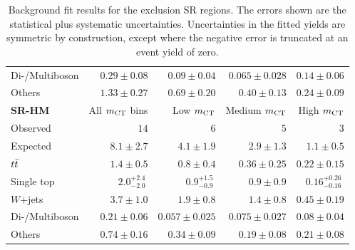 \begin{table}
\begin{center}
{\begin{tabular}{lrrrr}
Di-/Multiboson          & $0.29 \pm 0.08$          & $0.09 \pm 0.04$          & $0.065 \pm 0.028$          & $0.14 \pm 0.06$              \\
Others          & $1.33 \pm 0.27$          & $0.69 \pm 0.20$          & $0.40 \pm 0.13$          & $0.24 \pm 0.09$              \\
\bottomrule
\textbf{ SR-HM}           & All $m_{\textrm{CT}}$ bins          & Low $m_{\textrm{CT}}$         & Medium $m_{\textrm{CT}}$        & High $m_{\textrm{CT}}$    \\[-0.05cm]
\midrule
Observed           & $14$              & $6$              & $5$              & $3$                    \\
\midrule
 Expected          & $8.1 \pm 2.7$          & $4.1 \pm 1.9$          & $2.9 \pm 1.3$          & $1.1 \pm 0.5$              \\
\midrule
         $t\bar{t}$          & $1.4 \pm 0.5$          & $0.8 \pm 0.4$          & $0.36 \pm 0.25$          & $0.22 \pm 0.15$              \\
Single top          & $2.0_{-2.0}^{+2.4}~$          & $0.9_{-0.9}^{+1.5}~$         & $0.9 \pm 0.9$          & $0.16_{-0.16}^{+0.26}~$              \\
$W$+jets           & $3.7 \pm 1.0$          & $1.9 \pm 0.8$          & $1.4 \pm 0.8$          & $0.45 \pm 0.19$              \\
Di-/Multiboson          & $0.21 \pm 0.06$          & $0.057 \pm 0.025$          & $0.075 \pm 0.027$          & $0.08 \pm 0.04$              \\
Others          & $0.74 \pm 0.16$          & $0.34 \pm 0.09$          & $0.19 \pm 0.08$          & $0.21 \pm 0.08$              \\
\bottomrule
\end{tabular}
}
\end{center}
\caption{ Background fit results for the exclusion SR regions. %
The errors shown are the statistical plus systematic uncertainties.
Uncertainties in the fitted yields are symmetric by construction,
except where the negative error is truncated at an event yield of zero.
}
\label{tab:results_bkg_only_SR}
\end{table}
%
